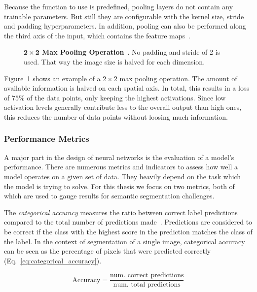 Because the function to use is predefined, pooling layers do not contain any trainable parameters. But still they are configurable with the kernel size, stride and padding hyperparameters. In addition, pooling can also be performed along the third axis of the input, which contains the feature maps~\cite[p.~370]{praxiseinstieg_ml17}.

\begin{figure}[h]
    \centering
    
    \caption[$2\times 2$ Max Pooling Operation]
    {\textbf{$\mathbf{2\times 2}$ Max Pooling Operation}~\cite[modified]{stanford_convnet}. No padding and stride of 2 is used. That way the image size is halved for each dimension.}
    \label{fig:pooling}
\end{figure}

Figure~\ref{fig:pooling} shows an example of a $2\times 2$ max pooling operation. The amount of available information is halved on each spatial axis. In total, this results in a loss of $75\%$ of the data points, only keeping the highest activations. Since low activation levels generally contribute less to the overall output than high ones, this reduces the number of data points without loosing much information.

\subsubsection{Performance Metrics}
\label{sec:metrics}
A major part in the design of neural networks is the evaluation of a model's performance. There are numerous metrics and indicators to assess how well a model operates on a given set of data. They heavily depend on the task which the model is trying to solve. For this thesis we focus on two metrics, both of which are used to gauge results for semantic segmentation challenges.

The \emph{categorical accuracy} measures the ratio between correct label predictions compared to the total number of predictions made~\cite{tf_whitepaper15}. Predictions are considered to be correct if the class with the highest score in the prediction matches the class of the label. In the context of segmentation of a single image, categorical accuracy can be seen as the percentage of pixels that were predicted correctly (Eq.~\ref{eq:categorical_accuracy}).

\begin{equation}
    \label{eq:categorical_accuracy}
    \text{Accuracy} = \frac{\text{num. correct predictions}}{\text{num. total predictions}}
\end{equation}

